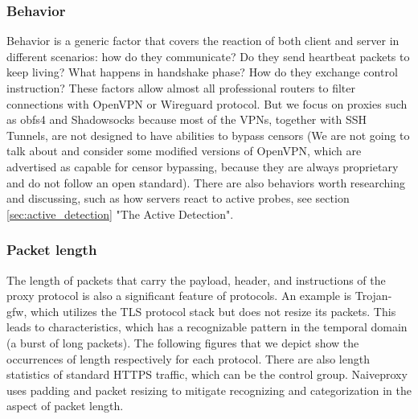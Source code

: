 \documentclass[conference]{IEEEtran}
\begin{document}
\subsubsection{Behavior}
Behavior is a generic factor that covers the reaction of both client and server in different scenarios: how do they communicate? Do they send heartbeat packets to keep living? What happens in handshake phase? How do they exchange control instruction? These factors allow almost all professional routers to filter connections with OpenVPN or Wireguard protocol. But we focus on proxies such as obfs4 and Shadowsocks because most of the VPNs, together with SSH Tunnels, are not designed to have abilities to bypass censors (We are not going to talk about and consider some modified versions of OpenVPN, which are advertised as capable for censor bypassing, because they are always proprietary and do not follow an open standard). There are also behaviors worth researching and discussing, such as how servers react to active probes, see section \ref{sec:active_detection} "The Active Detection".

\subsubsection{Packet length}
The length of packets that carry the payload, header, and instructions of the proxy protocol is also a significant feature of protocols. An example is Trojan-gfw, which utilizes the TLS protocol stack but does not resize its packets. This leads to characteristics, which has a recognizable pattern in the temporal domain (a burst of long packets).
The following figures that we depict show the occurrences of length respectively for each protocol. 
There are also length statistics of standard HTTPS traffic, which can be the control group. Naiveproxy uses padding and packet resizing to mitigate recognizing and categorization in the aspect of packet length. 


\end{document}
